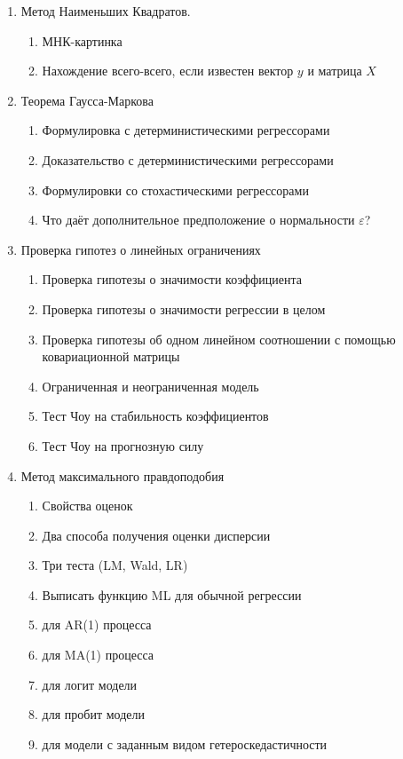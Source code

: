 \documentclass[12pt, a4paper]{article}\usepackage[]{graphicx}\usepackage[]{color}
\begin{document}
\begin{enumerate}

\item Метод Наименьших Квадратов.

\begin{enumerate}
\item МНК-картинка
\item Нахождение всего-всего, если известен вектор $y$ и матрица $X$
  \end{enumerate}

\item Теорема Гаусса-Маркова
\begin{enumerate}
\item Формулировка с детерминистическими регрессорами
\item Доказательство с детерминистическими регрессорами
\item Формулировки со стохастическими регрессорами
\item Что даёт дополнительное предположение о нормальности $\varepsilon$?
\end{enumerate}

\item Проверка гипотез о линейных ограничениях
\begin{enumerate}
\item Проверка гипотезы о значимости коэффициента
\item Проверка гипотезы о значимости регрессии в целом
\item Проверка гипотезы об одном линейном соотношении с помощью ковариационной матрицы
\item Ограниченная и неограниченная модель
\item Тест Чоу на стабильность коэффициентов
\item Тест Чоу на прогнозную силу
\end{enumerate}

\item Метод максимального правдоподобия

\begin{enumerate}
\item Свойства оценок
\item Два способа получения оценки дисперсии
\item Три теста (LM, Wald, LR)
\item Выписать функцию ML для обычной регрессии
\item для AR(1) процесса
\item для MA(1) процесса
\item для логит модели
\item для пробит модели
\item для модели с заданным видом гетероскедастичности
\end{enumerate}


\end{enumerate}
\end{document}
